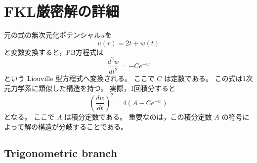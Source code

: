 \documentclass[11pt,a4paper]{ltjsarticle}
\theoremstyle{definition}
\theoremstyle{remark}
\begin{document}
\section{FKL厳密解の詳細\label{appendix:FKL}}
元の式の無次元化ポテンシャル$u$を
\begin{equation}
u(r)=2t+w(t)
\end{equation}
と変数変換すると，PB方程式は
\begin{equation}
\frac{d^2 w}{dt^2}
=-C e^{-w}
\label{Liouville_form}
\end{equation}
という Liouville 型方程式へ変換される。
ここで
\(C\)
は定数である。
この式は1次元力学系に類似した構造を持つ。
実際，1回積分すると
\begin{equation}
\left(\frac{dw}{dt}\right)^2
=4(A-Ce^{-w})
\label{first_integral}
\end{equation}
となる。
ここで
\(A\)
は積分定数である。
重要なのは，この積分定数
\(A\)
の符号によって解の構造が分岐することである。


\subsection{Trigonometric branch}
\end{document}
